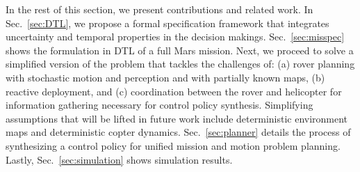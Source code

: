 \documentclass[conference]{IEEEtran}
\begin{document}
	In the rest of this section, we present contributions and related work.
	In Sec.~\ref{sec:DTL}, we propose a formal specification framework that integrates uncertainty and temporal
	properties in the decision makings.
	Sec.~\ref{sec:misspec} shows the formulation in DTL of a full Mars mission.
	Next, we proceed to solve a simplified version of the problem that tackles the challenges of:
	(a) rover planning with stochastic motion and perception and with partially known maps,
	(b) reactive deployment,
	and (c) coordination between the rover and helicopter for information gathering necessary
	for control policy synthesis.
	Simplifying assumptions that will be lifted in future work include deterministic environment maps
	and deterministic copter dynamics.
	Sec.~\ref{sec:planner} details the process of synthesizing a control policy for unified mission
	and motion problem planning.
	Lastly, Sec.~\ref{sec:simulation} shows simulation results.
	
\end{document}
